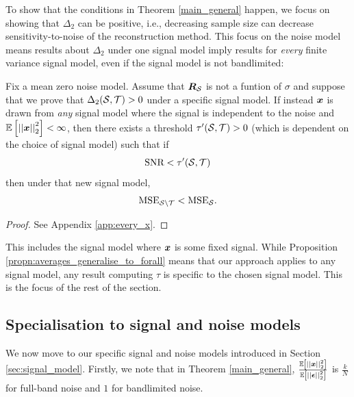 {\color{black}

To show that the conditions in Theorem \ref{main_general} happen, we focus on showing that $\Delta_{2}$ can be positive, i.e., decreasing sample size can decrease sensitivity-to-noise of the reconstruction method.
This focus on the noise model means results about $\Delta_{2}$ under one signal model imply results for \emph{every} finite variance signal model, even if the signal model is not bandlimited:

\begin{propn}
\label{propn:averages_generalise_to_forall}
    Fix a mean zero noise model. Assume that $\bm{R}_{\mathcal{S}}$ is not a funtion of $\sigma$ and suppose that we prove that $\Delta_{2}(\mathcal{S},\mathcal{T}) > 0$ under a specific signal model. If instead $\bm{x}$ is drawn from \emph{any} signal model where the signal is independent to the noise and  $\expect{\sqnormvec{\vect{x}}} < \infty$, then there exists a threshold $\tau'(\mathcal{S},\mathcal{T}) > 0$ (which is dependent on the choice of signal model) such that if
    \begin{equation}
        \textrm{SNR} < \tau'(\mathcal{S},\mathcal{T})
    \end{equation}
    then under that new signal model,
    \begin{equation}
        \textrm{MSE}_{\mathcal{S} \backslash \mathcal{T}}  < \textrm{MSE}_{\mathcal{S}}.
    \end{equation}
\end{propn}
\begin{proof}
    See Appendix \ref{app:every_x}.
\end{proof}  

\noindent This includes the signal model where $\bm{x}$ is some fixed signal. While Proposition \ref{propn:averages_generalise_to_forall} means that our approach applies to any signal model, any result computing $\tau$ is specific to the chosen signal model. This is the focus of the rest of the section.

\subsection{Specialisation to signal and noise models}
\label{sec:every_x}
We now move to our specific signal and noise models introduced in Section \ref{sec:signal_model}. Firstly, we note that in Theorem \ref{main_general}, $\frac{\expect{\sqnormvec{\vect{x}}}}{\expect{\sqnormvec{\vect{\epsilon}}}}$
 is $\frac{k}{N}$ for full-band noise and $1$ for bandlimited noise.

}
